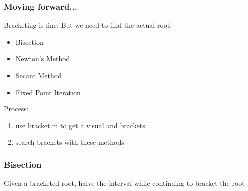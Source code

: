 \documentclass[10pt]{beamer}
\begin{document}
%
\begin{frame}
\frametitle{Moving forward...}
Bracketing is fine.  But we need to find the actual root:
\begin{itemize}
  \item Bisection
  \item Newton's Method
  \item Secant Method
  \item Fixed Point Iteration
\end{itemize}

Process:
\begin{enumerate}
  \item use bracket.m to get a visual and brackets
  \item search brackets with these methods
\end{enumerate}
\end{frame}
\begin{frame}
\frametitle{Bisection}

Given a bracketed root, halve the interval while continuing to
bracket the root

\begin{center}
\end{center}





\end{frame}
\end{document}
